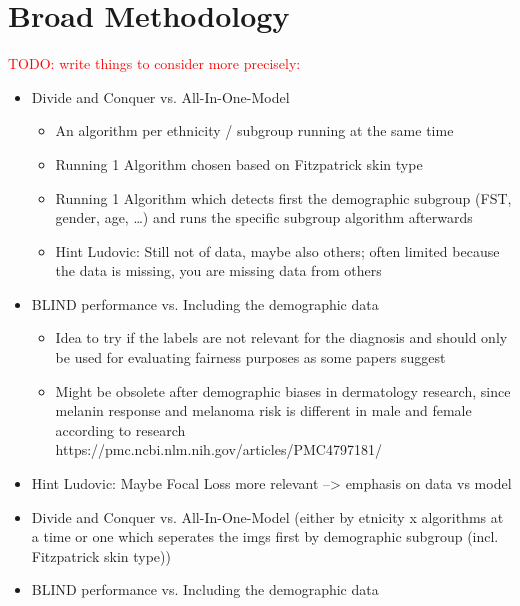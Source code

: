 \documentclass[12pt, a4paper, oneside]{book}   	%
\renewcommand{\todo}[1]{\textcolor{red}{TODO: #1}}
\begin{document}
		\section{Broad Methodology}
			\todo{write things to consider more precisely:}
			\begin{itemize}
				\item Divide and Conquer vs. All-In-One-Model
				\begin{itemize}
					 \item An algorithm per ethnicity / subgroup running at the same time
					\item Running 1 Algorithm chosen based on Fitzpatrick skin type
					\item Running 1 Algorithm which detects first the demographic subgroup (\gls{FST}, gender, age, …) and runs the specific subgroup algorithm afterwards
					\item Hint Ludovic: Still not of data, maybe also others; often limited because the data is missing, you are missing data from others
				\end{itemize}
				\item BLIND performance vs. Including the demographic data
				\begin{itemize}
					\item Idea to try if the labels are not relevant for the diagnosis and should only be used for evaluating fairness purposes as some papers suggest 
					\item Might be obsolete after demographic biases in dermatology research, since melanin response and melanoma risk is different in male and female according to research https://pmc.ncbi.nlm.nih.gov/articles/PMC4797181/
				\end{itemize}
				\item Hint Ludovic: Maybe Focal Loss more relevant --> emphasis on data vs model
			\end{itemize}
			\begin{itemize}
				\item Divide and Conquer vs. All-In-One-Model (either by etnicity x algorithms at a time or one which seperates the imgs first by demographic subgroup (incl. Fitzpatrick skin type))
				\item BLIND performance vs. Including the demographic data
			\end{itemize}
\end{document}
